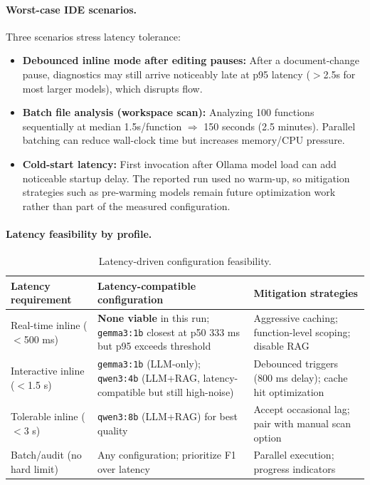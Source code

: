 \paragraph{Worst-case IDE scenarios.}
Three scenarios stress latency tolerance:
\begin{itemize}
  \item \textbf{Debounced inline mode after editing pauses:} After a document-change pause, diagnostics may still arrive noticeably late at p95 latency ($>$2.5s for most larger models), which disrupts flow.
  \item \textbf{Batch file analysis (workspace scan):} Analyzing 100 functions sequentially at median 1.5s/function $\Rightarrow$ 150 seconds (2.5 minutes). Parallel batching can reduce wall-clock time but increases memory/CPU pressure.
  \item \textbf{Cold-start latency:} First invocation after Ollama model load can add noticeable startup delay. The reported run used no warm-up, so mitigation strategies such as pre-warming models remain future optimization work rather than part of the measured configuration.
\end{itemize}

\paragraph{Latency feasibility by profile.}
\begin{table}[H]
  \centering
  \caption{Latency-driven configuration feasibility.}
  \label{tab:latency-deployment}
  \small
  \begin{tabularx}{\textwidth}{p{}Xp{}}
    \toprule
    Latency requirement & Latency-compatible configuration & Mitigation strategies \\
    \midrule
    Real-time inline ($<$500 ms) & \textbf{None viable} in this run; \texttt{gemma3:1b} closest at p50 333 ms but p95 exceeds threshold & Aggressive caching; function-level scoping; disable RAG \\
    Interactive inline ($<$1.5 s) & \texttt{gemma3:1b} (LLM-only); \texttt{qwen3:4b} (LLM+RAG, latency-compatible but still high-noise) & Debounced triggers (800 ms delay); cache hit optimization \\
    Tolerable inline ($<$3 s) & \texttt{qwen3:8b} (LLM+RAG) for best quality & Accept occasional lag; pair with manual scan option \\
    Batch/audit (no hard limit) & Any configuration; prioritize F1 over latency & Parallel execution; progress indicators \\
    \bottomrule
  \end{tabularx}
\end{table}

